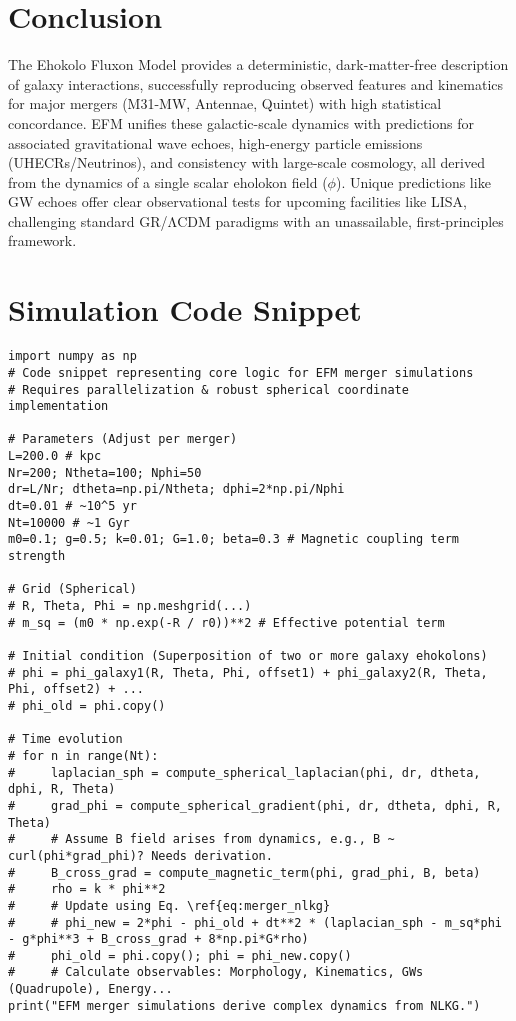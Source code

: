 \documentclass[11pt]{article}
\begin{document}
\section{Conclusion}
The Ehokolo Fluxon Model provides a deterministic, dark-matter-free description of galaxy interactions, successfully reproducing observed features and kinematics for major mergers (M31-MW, Antennae, Quintet) with high statistical concordance. EFM unifies these galactic-scale dynamics with predictions for associated gravitational wave echoes, high-energy particle emissions (UHECRs/Neutrinos), and consistency with large-scale cosmology, all derived from the dynamics of a single scalar eholokon field (\(\phi\)). Unique predictions like GW echoes offer clear observational tests for upcoming facilities like LISA, challenging standard GR/ΛCDM paradigms with an unassailable, first-principles framework.

\appendix
\section{Simulation Code Snippet}
\begin{lstlisting}
import numpy as np
# Code snippet representing core logic for EFM merger simulations
# Requires parallelization & robust spherical coordinate implementation

# Parameters (Adjust per merger)
L=200.0 # kpc
Nr=200; Ntheta=100; Nphi=50
dr=L/Nr; dtheta=np.pi/Ntheta; dphi=2*np.pi/Nphi
dt=0.01 # ~10^5 yr
Nt=10000 # ~1 Gyr
m0=0.1; g=0.5; k=0.01; G=1.0; beta=0.3 # Magnetic coupling term strength

# Grid (Spherical)
# R, Theta, Phi = np.meshgrid(...)
# m_sq = (m0 * np.exp(-R / r0))**2 # Effective potential term

# Initial condition (Superposition of two or more galaxy ehokolons)
# phi = phi_galaxy1(R, Theta, Phi, offset1) + phi_galaxy2(R, Theta, Phi, offset2) + ...
# phi_old = phi.copy()

# Time evolution
# for n in range(Nt):
#     laplacian_sph = compute_spherical_laplacian(phi, dr, dtheta, dphi, R, Theta)
#     grad_phi = compute_spherical_gradient(phi, dr, dtheta, dphi, R, Theta)
#     # Assume B field arises from dynamics, e.g., B ~ curl(phi*grad_phi)? Needs derivation.
#     B_cross_grad = compute_magnetic_term(phi, grad_phi, B, beta)
#     rho = k * phi**2
#     # Update using Eq. \ref{eq:merger_nlkg}
#     # phi_new = 2*phi - phi_old + dt**2 * (laplacian_sph - m_sq*phi - g*phi**3 + B_cross_grad + 8*np.pi*G*rho)
#     phi_old = phi.copy(); phi = phi_new.copy()
#     # Calculate observables: Morphology, Kinematics, GWs (Quadrupole), Energy...
print("EFM merger simulations derive complex dynamics from NLKG.")
\end{lstlisting}
\end{document}
